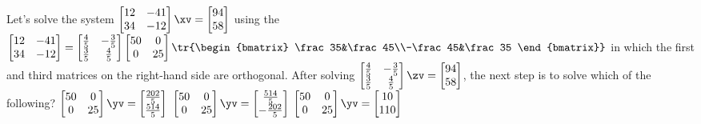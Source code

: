 \begin{activity}
Let's solve the system \(\begin{bmatrix} 12&-41\\34&-12 \end{bmatrix}\xv=\begin{bmatrix} 94\\58 \end{bmatrix}\) using the 
\(\begin{bmatrix} 12&-41\\34&-12 \end{bmatrix}
=\begin{bmatrix} \frac45&-\frac35\\\frac35&\frac45 \end{bmatrix}
\begin{bmatrix} 50&0\\0&25 \end{bmatrix}
\tr{\begin{bmatrix} \frac35&\frac45\\-\frac45&\frac35 \end{bmatrix}}\)
in which the first and third matrices on the right-hand side are orthogonal. 
After solving \(\begin{bmatrix} \frac45&-\frac35\\\frac35&\frac45 \end{bmatrix}\zv=\begin{bmatrix} 94\\58 \end{bmatrix}\), the next step is to solve which of the following?
{\(\begin{bmatrix} 50&0\\0&25 \end{bmatrix}\yv=\begin{bmatrix} \frac{202}5\\\frac{514}5 \end{bmatrix}\)}
{\(\begin{bmatrix} 50&0\\0&25 \end{bmatrix}\yv=\begin{bmatrix}  \frac{514}5\\-\frac{202}5 \end{bmatrix}\)}
{\(\begin{bmatrix} 50&0\\0&25 \end{bmatrix}\yv=\begin{bmatrix} 10\\110 \end{bmatrix}\)}
\end{activity}






